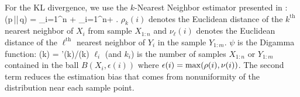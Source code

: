 For the KL divergence, we use the $k$-Nearest Neighbor estimator presented in
\cite{wang2009}: 
\beq
{} \approx {}(p\,||\,q) = 
\sum\limits_{i=1}^n  +
 \sum\limits_{i=1}^n + \log
{}. 
\eeq
$\rho_k(i)$ denotes the Euclidean distance of the $k^\mathrm{th}$ nearest neighbor 
of $X_i$ from sample $X_{1:n}$ and $\nu_\ell(i)$ denotes the Euclidean distance 
of the $\ell^\mathrm{th}$ nearest neighbor of $Y_i$ in the sample $Y_{1:m}$.
$\psi$ is the Digamma function: 
\beq
\psi(k) = \Gamma'(k)/\Gamma(k)
\eeq
$\ell_i$ (and $k_i$) is the number of samples $X_{1:n}$ or $Y_{1:m}$ contained 
in the ball $B(X_i, \epsilon(i))$ where $\epsilon(i) = {\rm max}(\rho(i),
\nu(i))$.
The second term reduces the estimation bias that comes from nonuniformity of
the distribution near each sample point. 
